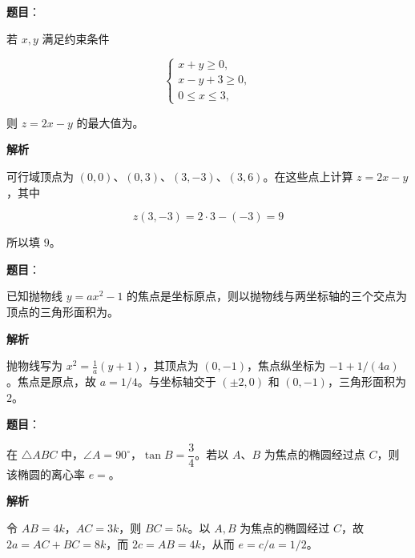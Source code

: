 \begin{answer}

\textbf{题目}：

若 $x,y$ 满足约束条件

\nopagebreak[4]
\[
\begin{cases}
x+y\geqslant0,\\
x-y+3\geqslant0,\\
0\leqslant x\leqslant3,
\end{cases}
\]

则 $z=2x-y$ 的最大值为\gkblank{}。

\textbf{解析}

可行域顶点为 $(0,0)$、$(0,3)$、$(3,-3)$、$(3,6)$。在这些点上计算 $z=2x-y$，其中

\nopagebreak[4]
\[
z(3,-3)=2\cdot3-(-3)=9
\]

所以填 $9$。


\end{answer}
\begin{answer}

\textbf{题目}：

已知抛物线 $y=ax^2-1$ 的焦点是坐标原点，则以抛物线与两坐标轴的三个交点为顶点的三角形面积为\gkblank{}。

\textbf{解析}

抛物线写为 $x^2=\frac1a(y+1)$，其顶点为 $(0,-1)$，焦点纵坐标为 $-1+1/(4a)$。焦点是原点，故 $a=1/4$。与坐标轴交于 $(\pm2,0)$ 和 $(0,-1)$，三角形面积为 $2$。


\end{answer}
\begin{answer}

\textbf{题目}：

在 $\triangle ABC$ 中，$\angle A=90^\circ$，$\tan B=\dfrac34$。若以 $A\text{、}B$ 为焦点的椭圆经过点 $C$，则该椭圆的离心率 $e=$\gkblank{}。

\textbf{解析}

令 $AB=4k$，$AC=3k$，则 $BC=5k$。以 $A,B$ 为焦点的椭圆经过 $C$，故 $2a=AC+BC=8k$，而 $2c=AB=4k$，从而 $e=c/a=1/2$。


\end{answer}
